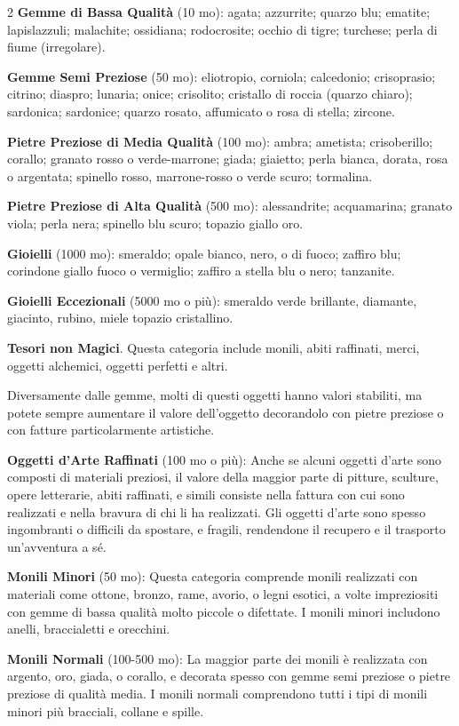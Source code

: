 \begin{multicols}{2}
\textbf{Gemme di Bassa Qualità} (10 mo): agata; azzurrite; quarzo blu; ematite; lapislazzuli; malachite; ossidiana; rodocrosite; occhio di tigre; turchese; perla di fiume (irregolare).

\textbf{Gemme Semi Preziose} (50 mo): eliotropio, corniola; calcedonio; crisoprasio; citrino; diaspro; lunaria; onice; crisolito; cristallo di roccia (quarzo chiaro); sardonica; sardonice; quarzo rosato, affumicato o rosa di stella; zircone.

\textbf{Pietre Preziose di Media Qualità} (100 mo): ambra; ametista; crisoberillo; corallo; granato rosso o verde-marrone; giada; giaietto; perla bianca, dorata, rosa o argentata; spinello rosso, marrone-rosso o verde scuro; tormalina.

\textbf{Pietre Preziose di Alta Qualità} (500 mo): alessandrite; acquamarina; granato viola; perla nera; spinello blu scuro; topazio giallo oro.

\textbf{Gioielli} (1000 mo): smeraldo; opale bianco, nero, o di fuoco; zaffiro blu; corindone giallo fuoco o vermiglio; zaffiro a stella blu o nero; tanzanite.

\textbf{Gioielli Eccezionali} (5000 mo o più): smeraldo verde brillante, diamante, giacinto, rubino, miele topazio cristallino.

\textbf{Tesori non Magici}. Questa categoria include monili, abiti raffinati, merci, oggetti alchemici, oggetti perfetti e altri.

Diversamente dalle gemme, molti di questi oggetti hanno valori stabiliti, ma potete sempre aumentare il valore dell'oggetto decorandolo con pietre preziose o con fatture particolarmente artistiche.

\textbf{Oggetti d'Arte Raffinati} (100 mo o più): Anche se alcuni oggetti d'arte sono composti di materiali preziosi, il valore della maggior parte di pitture, sculture, opere letterarie, abiti raffinati, e simili consiste nella fattura con cui sono realizzati e nella bravura di chi li ha realizzati. Gli oggetti d'arte sono spesso ingombranti o difficili da spostare, e fragili, rendendone il recupero e il trasporto un'avventura a sé.

\textbf{Monili Minori} (50 mo): Questa categoria comprende monili realizzati con materiali come ottone, bronzo, rame, avorio, o legni esotici, a volte impreziositi con gemme di bassa qualità molto piccole o difettate. I monili minori includono anelli, braccialetti e orecchini.

\textbf{Monili Normali} (100-500 mo): La maggior parte dei monili è realizzata con argento, oro, giada, o corallo, e decorata spesso con gemme semi preziose o pietre preziose di qualità media. I monili normali comprendono tutti i tipi di monili minori più bracciali, collane e spille.


\end{multicols}
